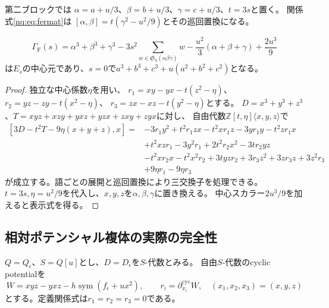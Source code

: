 第二ブロックでは
$\alpha=a+u/3$、$\beta=b+u/3$、$\gamma=c+u/3$、$t=3s$と置く。
関係式\eqref{nq:eq:fermat}は
$[\alpha,\beta]=t(\gamma^2-u^2/9)$とその巡回置換になる。
\begin{lemma}[Fermat側の混合中心元]\label{nq:lem:fermat-center}
\begin{equation}
 \Gamma_{\mathrm F}(s)=
 \alpha^3+\beta^3+\gamma^3
 -3s^2\!\sum_{w\in\mathfrak S_3(\alpha\beta\gamma)}w
 -\frac{u^2}{3}(\alpha+\beta+\gamma)+\frac{2u^3}{9}
 \label{nq:eq:centerF}
\end{equation}
は$E_s$の中心元であり、$s=0$で$a^3+b^3+c^3+u(a^2+b^2+c^2)$となる。
\end{lemma}
\begin{proof}
独立な中心係数$\eta$を用い、
$r_1=xy-yx-t(z^2-\eta)$、$r_2=yz-zy-t(x^2-\eta)$、
$r_3=zx-xz-t(y^2-\eta)$とする。
$D=x^3+y^3+z^3$、$T=xyz+xzy+yxz+yzx+zxy+zyx$に対し、
自由代数$\mathbb Z[t,\eta]\langle x,y,z\rangle$で
\begin{equation}\begin{aligned}
 [3D-t^2T-9\eta(x+y+z),x]={}&
 -3r_1y^2+t^2r_1zx-t^2xr_1z-3yr_1y-t^2zr_1x\\
 &+t^2xzr_1-3y^2r_1+2t^2r_2x^2-3tr_2yz\\
 &-t^2xr_2x-t^2x^2r_2+3tyzr_2
 +3r_3z^2+3zr_3z+3z^2r_3\\
 &+9\eta r_1-9\eta r_3
\end{aligned}\end{equation}
が成立する。語ごとの展開と巡回置換により三交換子を処理できる。
$t=3s,\eta=u^2/9$を代入し、$x,y,z$を$\alpha,\beta,\gamma$に置き換える。
中心スカラー$2u^3/9$を加えると表示式を得る。
\end{proof}

\subsection{相対ポテンシャル複体の実際の完全性}
$Q=Q_\epsilon$、$S=Q[u]$とし、$D=D_\epsilon$を$S$-代数とみる。
自由$S$-代数のcyclic potentialを
\begin{equation}
 W=xyz-yxz-h\operatorname{sym}(f_\epsilon+ux^2),
 \qquad r_i=\partial^{\mathrm{cyc}}_{x_i}W,\quad(x_1,x_2,x_3)=(x,y,z)
\end{equation}
とする。定義関係式は$r_1=r_2=r_3=0$である。

